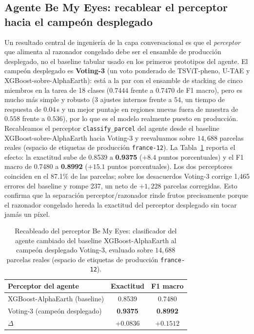 \subsection{Agente Be My Eyes: recablear el perceptor hacia el campeón desplegado}
\label{sec:results-perceiver}
Un resultado central de ingeniería de la capa conversacional es que el
\emph{perceptor} que alimenta al razonador congelado debe ser el ensamble
de producción desplegado, no el baseline tabular usado en los primeros
prototipos del agente. El campeón desplegado es \textbf{Voting-3} (un voto
ponderado de TSViT-pheno, U-TAE y XGBoost-sobre-AlphaEarth): está a la par
con el ensamble de stacking de cinco miembros en la tarea de 18 clases
($0.7444$ frente a $0.7470$ de F1 macro), pero es mucho más simple y
robusto ($3$ ajustes internos frente a $54$, un tiempo de respuesta de
$0.04$\,s y un mejor puntaje en regiones nuevas fuera de muestra de
$0.558$ frente a $0.536$), por lo que es el modelo realmente puesto en
producción. Recableamos el perceptor \texttt{classify\_parcel} del agente
desde el baseline XGBoost-sobre-AlphaEarth hacia Voting-3 y reevaluamos
sobre $14{,}688$ parcelas reales (espacio de etiquetas de producción
\texttt{france-12}). La Tabla~\ref{tab:perceiver} reporta el efecto: la
exactitud sube de 0.8539 a \textbf{0.9375} ($+8.4$ puntos porcentuales)
y el F1 macro de 0.7480 a \textbf{0.8992} ($+15.1$ puntos porcentuales).
Los dos perceptores coinciden en el 87.1\% de las parcelas; sobre los
desacuerdos Voting-3 corrige 1{,}465 errores del baseline y rompe 237,
un neto de $+1{,}228$ parcelas corregidas. Esto confirma que la
separación perceptor/razonador rinde frutos precisamente porque el
razonador congelado hereda la exactitud del perceptor desplegado sin
tocar jamás un píxel.

\begin{table}[htbp]
\caption{Recableado del perceptor Be My Eyes: clasificador del agente
cambiado del baseline XGBoost-AlphaEarth al campeón desplegado Voting-3,
evaluado sobre $14{,}688$ parcelas reales (espacio de etiquetas de
producción \texttt{france-12}).}
\label{tab:perceiver}
\centering
\begin{tabular}{lcc}
\toprule
\textbf{Perceptor del agente} & \textbf{Exactitud} & \textbf{F1 macro} \\
\midrule
XGBoost-AlphaEarth (baseline) & 0.8539 & 0.7480 \\
Voting-3 (campeón desplegado) & \textbf{0.9375} & \textbf{0.8992} \\
$\Delta$                      & $+0.0836$ & $+0.1512$ \\
\bottomrule
\end{tabular}
\end{table}

